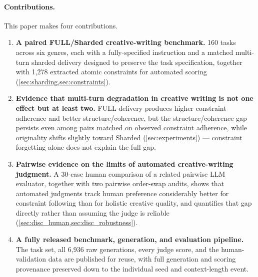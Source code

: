 \paragraph{Contributions.} This paper makes four contributions.
\begin{enumerate}
    \item \textbf{A paired FULL/Sharded creative-writing benchmark.} 160 tasks across six genres, each with a fully-specified instruction and a matched multi-turn sharded delivery designed to preserve the task specification, together with 1{,}278 extracted atomic constraints for automated scoring (\cref{sec:sharding,sec:constraints}).
    \item \textbf{Evidence that multi-turn degradation in creative writing is not one effect but at least two.} FULL delivery produces higher constraint adherence and better structure/coherence, but the structure/coherence gap persists even among pairs matched on observed constraint adherence, while originality shifts slightly toward Sharded (\cref{sec:experiments}) --- constraint forgetting alone does not explain the full gap.
    \item \textbf{Pairwise evidence on the limits of automated creative-writing judgment.} A 30-case human comparison of a related pairwise LLM evaluator, together with two pairwise order-swap audits, shows that automated judgments track human preference considerably better for constraint following than for holistic creative quality, and quantifies that gap directly rather than assuming the judge is reliable (\cref{sec:disc_human,sec:disc_robustness}).
    \item \textbf{A fully released benchmark, generation, and evaluation pipeline.} The task set, all 6{,}936 raw generations, every judge score, and the human-validation data are published for reuse, with full generation and scoring provenance preserved down to the individual seed and context-length event.
\end{enumerate}
